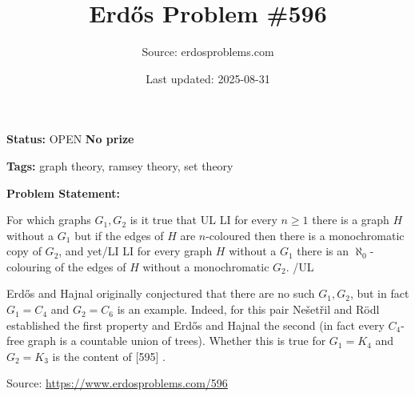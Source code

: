 \documentclass{article}
\title{Erd\H{o}s Problem \#596}
\date{Last updated: 2025-08-31}
\author{Source: erdosproblems.com}
\begin{document}
\maketitle

\noindent\textbf{Status:} OPEN \quad \textbf{No prize}

\noindent\textbf{Tags:} graph theory, ramsey theory, set theory

\medskip

\noindent\textbf{Problem Statement:}

For which graphs $G_1,G_2$ is it true that {UL} {LI} for every $n\geq 1$ there is a graph $H$ without a $G_1$ but if the edges of $H$ are $n$-coloured then there is a monochromatic copy of $G_2$, and yet{/LI} {LI} for every graph $H$ without a $G_1$ there is an $\aleph_0$-colouring of the edges of $H$ without a monochromatic $G_2$. {/UL}




Erd\H{o}s and Hajnal originally conjectured that there are no such $G_1,G_2$, but in fact $G_1=C_4$ and $G_2=C_6$ is an example. Indeed, for this pair Ne\v{s}et\v{r}il and R\"{o}dl established the first property and Erd\H{o}s and Hajnal the second (in fact every $C_4$-free graph is a countable union of trees). Whether this is true for $G_1=K_4$ and $G_2=K_3$ is the content of [595] .


\bigskip
\noindent\small{Source: \url{https://www.erdosproblems.com/596}}
\end{document}
